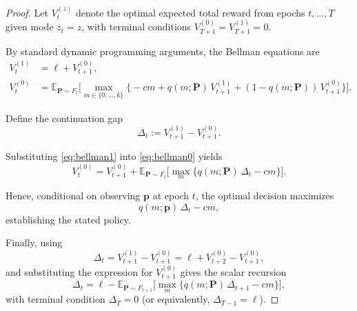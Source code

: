 \begin{proof}
Let $V_t^{(z)}$ denote the optimal expected total reward from epochs
$t,\dots,T$ given mode $z_t=z$,
with terminal conditions
$V_{T+1}^{(0)} = V_{T+1}^{(1)} = 0$.

By standard dynamic programming arguments,
the Bellman equations are
\begin{align}
V_t^{(1)} &= \ell + V_{t+1}^{(0)}, \label{eq:bellman1} \\
V_t^{(0)} &=
\mathbb E_{\mathbf P \sim F_t}
\Big[
\max_{m \in \{0,\dots,k\}}
\big\{
- c m
+ q(m;\mathbf P)\,V_{t+1}^{(1)}
+ (1-q(m;\mathbf P))\,V_{t+1}^{(0)}
\big\}
\Big].
\label{eq:bellman0}
\end{align}

Define the continuation gap
\[
\Delta_t := V_{t+1}^{(1)} - V_{t+1}^{(0)}.
\]

Substituting \eqref{eq:bellman1} into \eqref{eq:bellman0} yields
\[
V_t^{(0)}
=
V_{t+1}^{(0)}
+
\mathbb E_{\mathbf P \sim F_t}
\Big[
\max_m
\{ q(m;\mathbf P)\,\Delta_t - c m \}
\Big].
\]

Hence, conditional on observing $\mathbf p$ at epoch $t$,
the optimal decision maximizes
\[
q(m;\mathbf p)\,\Delta_t - c m,
\]
establishing the stated policy.

Finally, using
\[
\Delta_t
=
V_{t+1}^{(1)} - V_{t+1}^{(0)}
=
\ell + V_{t+2}^{(0)} - V_{t+1}^{(0)},
\]
and substituting the expression for $V_{t+1}^{(0)}$
gives the scalar recursion
\[
\Delta_t
=
\ell
-
\mathbb E_{\mathbf P \sim F_{t+1}}
\Big[
\max_m \{ q(m;\mathbf P)\,\Delta_{t+1} - c m \}
\Big],
\]
with terminal condition $\Delta_T = 0$ (or equivalently, $\Delta_{T-1} = \ell$).
\end{proof}




